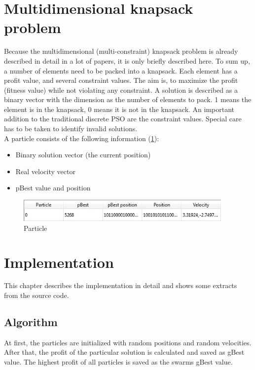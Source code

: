 \documentclass{article}
\begin{document}
\section{Multidimensional knapsack problem}
\label{lbl-mknap}
Because the multidimensional (multi-constraint) knapsack problem is already described in detail in a lot of papers, it is only briefly described here. To sum up, a number of elements need to be packed into a knapsack. Each element has a profit value, and several constraint values. The aim is, to maximize the profit (fitness value) while not violating any constraint. A solution is described as a binary vector with the dimension as the number of elements to pack. 1 means the element is in the knapsack, 0 means it is not in the knapsack. An important addition to the traditional discrete PSO are the constraint values. Special care has to be taken to identify invalid solutions.\\

A particle consists of the following information (\ref{fig-particle}):
\begin{itemize}
\item Binary solution vector (the current position)
\item Real velocity vector
\item pBest value and position
\end{itemize}

\begin{figure}[H]
    \centering
    \includegraphics[width=400px]{images/particle.PNG}
    \caption{Particle}
    \label{fig-particle}
\end{figure}

\section{Implementation}
\label{lbl-impl}
This chapter describes the implementation in detail and shows some extracts from the source code.

\subsection{Algorithm}
At first, the particles are initialized with random positions and random velocities. After that, the profit of the particular solution is calculated and saved as gBest value. The highest profit of all particles is saved as the swarms gBest value.
\end{document}
